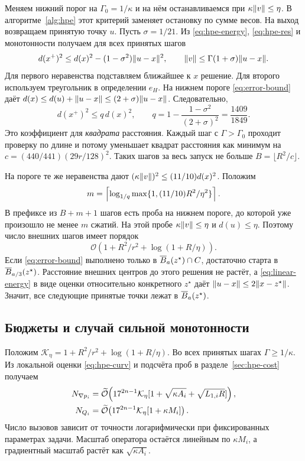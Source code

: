 Меняем нижний порог на $\Gamma_0=1/\kappa$ и на нём
останавливаемся при $\kappa\lVert v\rVert\le\eta$.
В алгоритме~\ref{alg:hpe} этот критерий заменяет остановку
по сумме весов. На выход возвращаем принятую точку $u$.
Пусть $\sigma=1/21$.
Из \eqref{eq:hpe-energy}, \eqref{eq:hpe-res} и монотонности
получаем для всех принятых шагов
\begin{equation}\label{eq:linear-energy}
 d(x^+)^2\le d(x)^2-(1-\sigma^2)\lVert u-x\rVert^2,\qquad
 \lVert v\rVert\le\Gamma(1+\sigma)\lVert u-x\rVert.
\end{equation}
Для первого неравенства подставляем ближайшее к $x$ решение.
Для второго используем треугольник в определении $e_H$.
На нижнем пороге \eqref{eq:error-bound} даёт
$d(x)\le d(u)+\lVert u-x\rVert\le(2+\sigma)\lVert u-x\rVert$.
Следовательно,
\begin{equation}\label{eq:hpe-q}
 d(x^+)^2\le q\,d(x)^2,\qquad
 q=1-\frac{1-\sigma^2}{(2+\sigma)^2}
   =\frac{1409}{1849}.
\end{equation}
Это коэффициент для \emph{квадрата} расстояния.
Каждый шаг с $\Gamma>\Gamma_0$ проходит проверку по длине и потому
уменьшает квадрат расстояния как минимум на
$c=(440/441)(29r/128)^2$. Таких шагов за весь запуск не больше
$B=\lfloor R^2/c\rfloor$.

На пороге те же неравенства дают
$(\kappa\lVert v\rVert)^2\le(11/10)d(x)^2$.
Положим
\[
  m=\left\lceil \log_{1/q}\max\{1,(11/10)R^2/\eta^2\}\right\rceil.
\]
В префиксе из $B+m+1$ шагов есть проба на нижнем пороге,
до которой уже произошло не менее $m$ сжатий.
На этой пробе $\kappa\lVert v\rVert\le\eta$ и $d(u)\le\eta$.
Поэтому число внешних шагов имеет порядок
\begin{equation}\label{eq:linear-steps}
 \mathcal O\!\left(1+R^2/r^2+\log(1+R/\eta)\right).
\end{equation}
Если \eqref{eq:error-bound} выполнено только в
$\overline B_a(z^\star)\cap C$, достаточно старта в $\overline B_{a/3}(z^\star)$.
Расстояние внешних центров до этого решения не растёт, а
\eqref{eq:linear-energy} в виде оценки относительно конкретного
$z^\star$ даёт $\lVert u-x\rVert\le2\lVert x-z^\star\rVert$.
Значит, все следующие принятые точки лежат в $\overline B_a(z^\star)$.

\subsection{Бюджеты и случай сильной монотонности}

Положим $\mathcal K_\eta=1+R^2/r^2+\log(1+R/\eta)$.
Во всех принятых шагах $\Gamma\ge1/\kappa$.
Из локальной оценки \eqref{eq:hpe-curv} и подсчёта проб в
разделе~\ref{sec:hpe-cost} получаем
\begin{align}
 N_{\nabla p_i}
 &=\widetilde{\mathcal O}\!\left(17^{2n-1}\mathcal K_\eta
               [1+\sqrt{\kappa A_i}+\sqrt{L_{1,i}R}]\right),
               \label{eq:linear-grad}\\
 N_{Q_i}
 &=\widetilde{\mathcal O}\!\left(17^{2n-1}\mathcal K_\eta[1+\kappa M_i]\right).
               \label{eq:linear-op}
\end{align}
Число вызовов зависит от точности логарифмически при фиксированных
параметрах задачи. Масштаб оператора остаётся линейным по $\kappa M_i$,
а градиентный масштаб растёт как $\sqrt{\kappa A_i}$.

